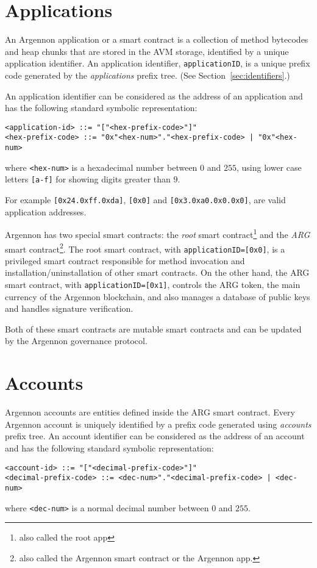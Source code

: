 

\section{Applications}\label{sec:applications}

An Argennon application or a smart contract is a collection of method bytecodes and heap chunks that are stored in
the AVM storage, identified by a unique application identifier. An application identifier, \texttt{applicationID}, is
a unique prefix code generated by the \emph{applications} prefix tree. (See Section~\ref{sec:identifiers}.)

An application identifier can
be considered as the address of an application and has the following standard symbolic representation:
\begin{verbatim}
<application-id> ::= "["<hex-prefix-code>"]"
<hex-prefix-code> ::= "0x"<hex-num>"."<hex-prefix-code> | "0x"<hex-num>
\end{verbatim}
where \texttt{<hex-num>} is a hexadecimal number between $0$ and $255$, using lower case
letters \texttt{[a-f]} for showing digits greater than $9$.

For example \texttt{[0x24.0xff.0xda]}, \texttt{[0x0]} and \texttt{[0x3.0xa0.0x0.0x0]}, are valid application addresses.

Argennon has two special smart contracts: the \emph{root} smart contract\footnote{also called the root app} and
the \emph{ARG} smart contract\footnote{also called the Argennon smart contract or the Argennon app.}.
The root smart contract, with \texttt{applicationID=[0x0]}, is a privileged smart contract responsible for
method invocation and installation/uninstallation of other smart contracts.
On the other hand, the ARG smart contract, with \texttt{applicationID=[0x1]}, controls the ARG token, the main
currency of the Argennon blockchain, and also manages a database of public keys and handles signature verification.

Both of these smart contracts are mutable smart contracts and can be updated by the Argennon governance protocol.


\section{Accounts}\label{sec:accounts}

Argennon accounts are entities defined inside the ARG smart contract.
Every Argennon account is uniquely identified by a prefix code generated using \emph{accounts} prefix tree. An account
identifier can be considered as the address of an account and has the following standard symbolic representation:
\begin{verbatim}
<account-id> ::= "["<decimal-prefix-code>"]"
<decimal-prefix-code> ::= <dec-num>"."<decimal-prefix-code> | <dec-num>
\end{verbatim}
where \texttt{<dec-num>} is a normal decimal number between $0$ and $255$.

